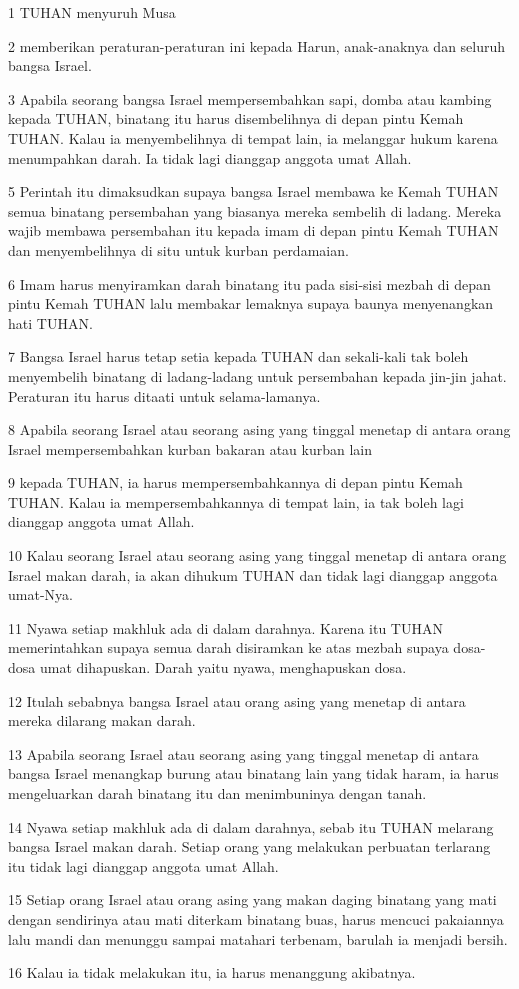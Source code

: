 \par 1 TUHAN menyuruh Musa
\par 2 memberikan peraturan-peraturan ini kepada Harun, anak-anaknya dan seluruh bangsa Israel.
\par 3 Apabila seorang bangsa Israel mempersembahkan sapi, domba atau kambing kepada TUHAN, binatang itu harus disembelihnya di depan pintu Kemah TUHAN. Kalau ia menyembelihnya di tempat lain, ia melanggar hukum karena menumpahkan darah. Ia tidak lagi dianggap anggota umat Allah.
\par 5 Perintah itu dimaksudkan supaya bangsa Israel membawa ke Kemah TUHAN semua binatang persembahan yang biasanya mereka sembelih di ladang. Mereka wajib membawa persembahan itu kepada imam di depan pintu Kemah TUHAN dan menyembelihnya di situ untuk kurban perdamaian.
\par 6 Imam harus menyiramkan darah binatang itu pada sisi-sisi mezbah di depan pintu Kemah TUHAN lalu membakar lemaknya supaya baunya menyenangkan hati TUHAN.
\par 7 Bangsa Israel harus tetap setia kepada TUHAN dan sekali-kali tak boleh menyembelih binatang di ladang-ladang untuk persembahan kepada jin-jin jahat. Peraturan itu harus ditaati untuk selama-lamanya.
\par 8 Apabila seorang Israel atau seorang asing yang tinggal menetap di antara orang Israel mempersembahkan kurban bakaran atau kurban lain
\par 9 kepada TUHAN, ia harus mempersembahkannya di depan pintu Kemah TUHAN. Kalau ia mempersembahkannya di tempat lain, ia tak boleh lagi dianggap anggota umat Allah.
\par 10 Kalau seorang Israel atau seorang asing yang tinggal menetap di antara orang Israel makan darah, ia akan dihukum TUHAN dan tidak lagi dianggap anggota umat-Nya.
\par 11 Nyawa setiap makhluk ada di dalam darahnya. Karena itu TUHAN memerintahkan supaya semua darah disiramkan ke atas mezbah supaya dosa-dosa umat dihapuskan. Darah yaitu nyawa, menghapuskan dosa.
\par 12 Itulah sebabnya bangsa Israel atau orang asing yang menetap di antara mereka dilarang makan darah.
\par 13 Apabila seorang Israel atau seorang asing yang tinggal menetap di antara bangsa Israel menangkap burung atau binatang lain yang tidak haram, ia harus mengeluarkan darah binatang itu dan menimbuninya dengan tanah.
\par 14 Nyawa setiap makhluk ada di dalam darahnya, sebab itu TUHAN melarang bangsa Israel makan darah. Setiap orang yang melakukan perbuatan terlarang itu tidak lagi dianggap anggota umat Allah.
\par 15 Setiap orang Israel atau orang asing yang makan daging binatang yang mati dengan sendirinya atau mati diterkam binatang buas, harus mencuci pakaiannya lalu mandi dan menunggu sampai matahari terbenam, barulah ia menjadi bersih.
\par 16 Kalau ia tidak melakukan itu, ia harus menanggung akibatnya.

